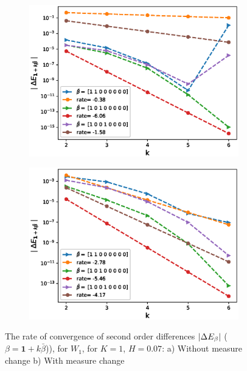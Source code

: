 \documentclass[11pt]{article}
\begin{document}
\begin{figure}[h!]
	\centering
	\begin{subfigure}{.45\textwidth}
		\centering
		\includegraphics[width=1\linewidth]{./figures/rBergomi_mixed_error_rates/without_change_measure/N_4/H_007/mixed_difference_order2_rbergomi_4steps_H_007_K_1_totally_hierarch_with_rate_W1}
		\caption{}
		\label{fig:sub3}
	\end{subfigure}%
	\begin{subfigure}{.45\textwidth}
		\centering
		\includegraphics[width=1\linewidth]{./figures/rBergomi_mixed_error_rates/partial_change_measure/N_4/H_007/mixed_difference_order2_rbergomi_4steps_H_007_K_1_totally_hierarch_with_rate_W1_change_measure_part_spec}
		\caption{}
		\label{fig:sub4}
	\end{subfigure}
	
	\caption{The rate of convergence of  second order differences $\left\lvert\Delta E_{\beta}\right\rvert$ ($\beta=\mathbf{1}+k \bar{\beta}$)), for $W_1$, for $K=1$, $H=0.07$: a) Without measure change b) With measure change}
	\label{fig:second_diff_comp_K_1_H_007_W_1}
\end{figure}
\end{document}
